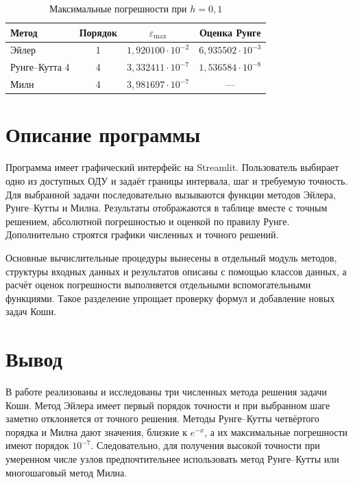 \documentclass[12pt,a4paper]{article}
\begin{document}
\begin{table}[H]
\centering
\caption{Максимальные погрешности при $h=0{,}1$}
\begin{tabular}{l|c|c|c}
\toprule
Метод & Порядок & $\varepsilon_{\max}$ & Оценка Рунге \\
\midrule
Эйлер & 1 & $1{,}920100\cdot10^{-2}$ & $6{,}935502\cdot10^{-3}$ \\
Рунге--Кутта 4 & 4 & $3{,}332411\cdot10^{-7}$ & $1{,}536584\cdot10^{-8}$ \\
Милн & 4 & $3{,}981697\cdot10^{-7}$ & --- \\
\bottomrule
\end{tabular}
\end{table}

\section{Описание программы}
Программа имеет графический интерфейс на Streamlit. Пользователь выбирает одно из доступных ОДУ и задаёт границы интервала, шаг и требуемую точность. Для выбранной задачи последовательно вызываются функции методов Эйлера, Рунге--Кутты и Милна. Результаты отображаются в таблице вместе с точным решением, абсолютной погрешностью и оценкой по правилу Рунге. Дополнительно строятся графики численных и точного решений.

Основные вычислительные процедуры вынесены в отдельный модуль методов, структуры входных данных и результатов описаны с помощью классов данных, а расчёт оценок погрешности выполняется отдельными вспомогательными функциями. Такое разделение упрощает проверку формул и добавление новых задач Коши.

\section*{Вывод}
В работе реализованы и исследованы три численных метода решения задачи Коши. Метод Эйлера имеет первый порядок точности и при выбранном шаге заметно отклоняется от точного решения. Методы Рунге--Кутты четвёртого порядка и Милна дают значения, близкие к $e^{-x}$, а их максимальные погрешности имеют порядок $10^{-7}$. Следовательно, для получения высокой точности при умеренном числе узлов предпочтительнее использовать метод Рунге--Кутты или многошаговый метод Милна.
\end{document}
